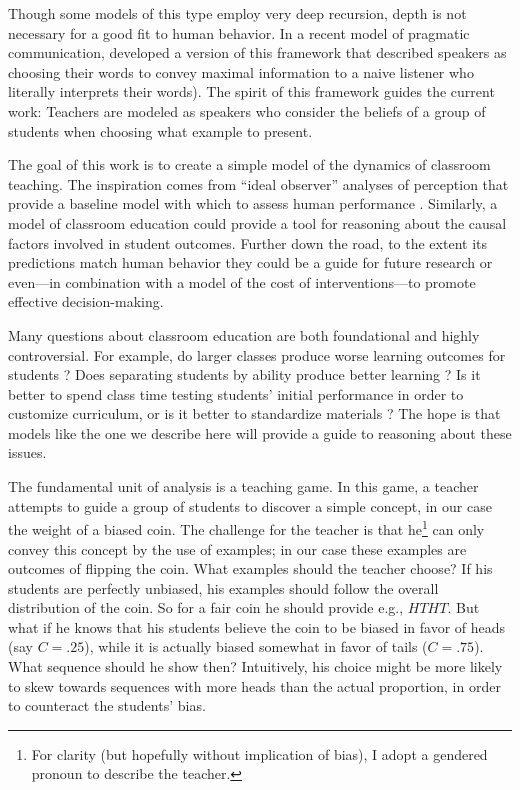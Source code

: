 \documentclass[10pt,letterpaper]{article}
\begin{document}
Though some models of this type employ very deep recursion, depth is not necessary for a good fit to human behavior. In a recent model of pragmatic communication,  developed a version of this framework that described speakers as choosing their words to convey maximal information to a naive listener who literally interprets their words). The spirit of this framework guides the current work: Teachers are modeled as speakers who consider the beliefs of a group of students when choosing what example to present. 

The goal of this work is to create a simple model of the dynamics of classroom teaching. The inspiration comes from ``ideal observer'' analyses of perception that provide a baseline model with which to assess human performance \cite{geisler2003,frank2013}. Similarly, a model of classroom education
could provide a tool for reasoning about the causal factors involved in student outcomes. Further down the road, to the extent its predictions match human behavior they could be a guide for future research or even---in combination with a model of the cost of interventions---to promote effective decision-making. 

Many questions about classroom education are both foundational and highly controversial. For example, do larger classes produce worse learning outcomes for students \cite{glass1979,slavin1989}? Does separating students by ability produce better learning \cite{slavin1987,wheelock1992}? Is it better to spend class time testing students' initial performance in order to customize curriculum, or is it better to standardize materials \cite{fuchs1986}? The hope is that models like the one we describe here will provide a guide to reasoning about these issues.

The fundamental unit of analysis is a teaching game. In this game, a teacher attempts to guide a group of students to discover a simple concept, in our case the weight of a biased coin. The challenge for the teacher is that he\footnote{For clarity (but hopefully without implication of bias), I adopt a gendered pronoun to describe the teacher.} can only convey this concept by the use of examples; in our case these examples are outcomes of flipping the coin. What examples should the teacher choose? If his students are perfectly unbiased, his examples should follow the overall distribution of the coin. So for a fair coin he should provide e.g., $HTHT$. But what if he knows that his students believe the coin to be biased in favor of heads (say $C=.25$), while it is actually biased somewhat in favor of tails ($C=.75$). What sequence should he show then? Intuitively, his choice might be more likely to skew towards sequences with more heads than the actual proportion, in order to counteract the students' bias.
\end{document}
